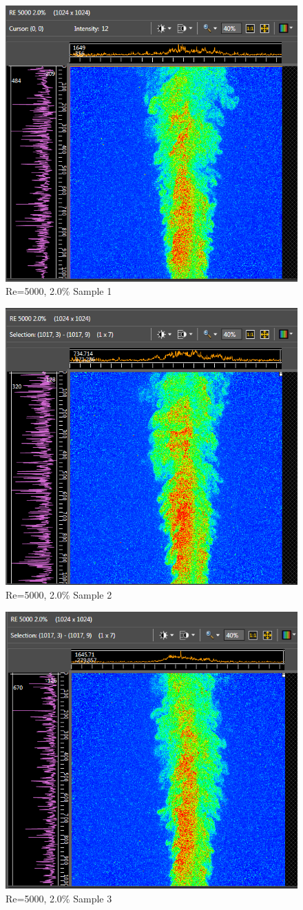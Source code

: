 \documentclass[preview,12pt]{article}
\begin{document}
\begin{figure}[h]
    \centering
    \includegraphics[width=0.55\linewidth]{RE-5000-20-1st.PNG}
    \caption{{\footnotesize Re=5000, 2.0\% Sample 1}}
\end{figure}
\begin{figure}[h]
    \centering
    \includegraphics[width=0.55\linewidth]{RE-5000-20-2nd.PNG}
    \caption{{\footnotesize Re=5000, 2.0\% Sample 2}}
\end{figure}
\begin{figure}[h]
    \centering
    \includegraphics[width=0.55\linewidth]{RE-5000-20-3rd.PNG}
    \caption{{\footnotesize Re=5000, 2.0\% Sample 3}}
\end{figure}
\end{document}
